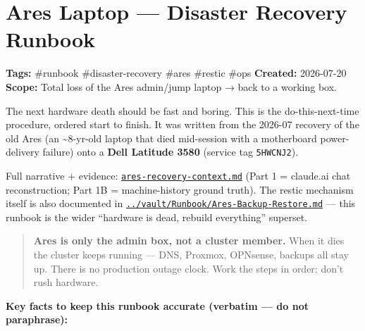 \documentclass[
]{article}
\author{}
\date{}
\begin{document}
\hypertarget{ares-laptop-disaster-recovery-runbook}{%
\section{Ares Laptop --- Disaster Recovery
Runbook}\label{ares-laptop-disaster-recovery-runbook}}

\textbf{Tags:} \#runbook \#disaster-recovery \#ares \#restic \#ops
\textbf{Created:} 2026-07-20 \textbf{Scope:} Total loss of the Ares
admin/jump laptop → back to a working box.

The next hardware death should be fast and boring. This is the
do-this-next-time procedure, ordered start to finish. It was written
from the 2026-07 recovery of the old Ares (an \textasciitilde8-yr-old
laptop that died mid-session with a motherboard power-delivery failure)
onto a \textbf{Dell Latitude 3580} (service tag \texttt{5HWCNJ2}).

Full narrative + evidence:
\href{ares-recovery-context.md}{\texttt{ares-recovery-context.md}} (Part
1 = claude.ai chat reconstruction; Part 1B = machine-history ground
truth). The restic mechanism itself is also documented in
\href{../vault/Runbook/Ares-Backup-Restore.md}{\texttt{../vault/Runbook/Ares-Backup-Restore.md}}
--- this runbook is the wider ``hardware is dead, rebuild everything''
superset.

\begin{quote}
\textbf{Ares is only the admin box, not a cluster member.} When it dies
the cluster keeps running --- DNS, Proxmox, OPNsense, backups all stay
up. There is no production outage clock. Work the steps in order; don't
rush hardware.
\end{quote}

\textbf{Key facts to keep this runbook accurate (verbatim --- do not
paraphrase):}
\end{document}
